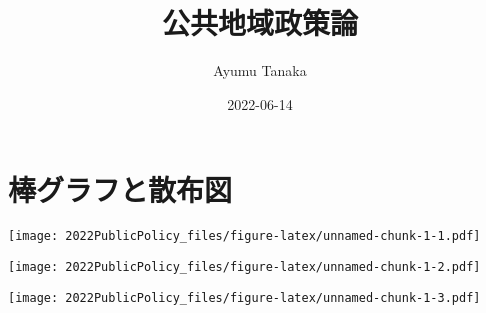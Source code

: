 \documentclass[
]{article}
\title{公共地域政策論}
\author{Ayumu Tanaka}
\date{2022-06-14}
\newenvironment{Shaded}{\begin{snugshade}}{\end{snugshade}}
\newcommand{\AttributeTok}[1]{\textcolor[rgb]{0.77,0.63,0.00}{#1}}
\newcommand{\FunctionTok}[1]{\textcolor[rgb]{0.00,0.00,0.00}{#1}}
\newcommand{\NormalTok}[1]{#1}
\newcommand{\OtherTok}[1]{\textcolor[rgb]{0.56,0.35,0.01}{#1}}
\newcommand{\SpecialCharTok}[1]{\textcolor[rgb]{0.00,0.00,0.00}{#1}}
\newcommand{\StringTok}[1]{\textcolor[rgb]{0.31,0.60,0.02}{#1}}
\begin{document}
\maketitle

\hypertarget{ux68d2ux30b0ux30e9ux30d5ux3068ux6563ux5e03ux56f3}{%
\section{棒グラフと散布図}\label{ux68d2ux30b0ux30e9ux30d5ux3068ux6563ux5e03ux56f3}}

\begin{Shaded}
\end{Shaded}

\texttt{[image: 2022PublicPolicy\_files/figure-latex/unnamed-chunk-1-1.pdf]}

\begin{Shaded}
\end{Shaded}

\texttt{[image: 2022PublicPolicy\_files/figure-latex/unnamed-chunk-1-2.pdf]}

\begin{Shaded}
\end{Shaded}

\texttt{[image: 2022PublicPolicy\_files/figure-latex/unnamed-chunk-1-3.pdf]}

\begin{Shaded}
\end{Shaded}
\end{document}
